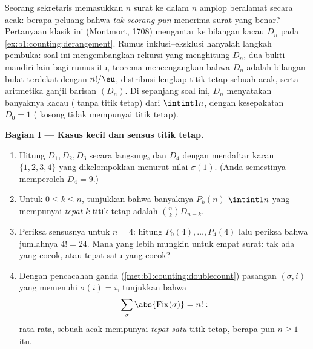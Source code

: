 \begin{problem}\label{pb:b1:counting:1}
Seorang sekretaris memasukkan $n$ surat ke dalam $n$ amplop beralamat secara acak:
berapa peluang bahwa \emph{tak seorang pun} menerima surat yang benar?
Pertanyaan klasik ini (Montmort, 1708) mengantar ke bilangan 
kacau $D_n$ pada \cref{ex:b1:counting:derangement}. Rumus
inklusi--eksklusi hanyalah langkah pembuka: soal ini
mengembangkan rekursi yang menghitung $D_n$, dua bukti mandiri lain
bagi rumus itu, teorema mencengangkan bahwa $D_n$ adalah
bilangan bulat terdekat dengan $n!/\eu$, distribusi lengkap titik tetap
sebuah  acak, serta aritmetika ganjil barisan
$(D_n)$.
Di sepanjang soal ini, $D_n$ menyatakan banyaknya  kacau (
tanpa titik tetap) dari $\intint1n$, dengan kesepakatan $D_0 = 1$
( kosong tidak mempunyai titik tetap).

\medskip
\noindent\textbf{Bagian I --- Kasus kecil dan sensus titik
tetap.}
\begin{enumerate}
  \item Hitung $D_1, D_2, D_3$ secara langsung, dan $D_4$ dengan mendaftar
         kacau $\{1, 2, 3, 4\}$ yang dikelompokkan menurut nilai
        $\sigma(1)$. (Anda semestinya memperoleh $D_4 = 9$.)
  \item Untuk $0 \leq k \leq n$, tunjukkan bahwa banyaknya $P_k(n)$
         $\intint1n$ yang mempunyai \emph{tepat} $k$ titik
        tetap adalah $\binom nk D_{n-k}$.
  \item Periksa sensusnya untuk $n = 4$: hitung $P_0(4), \dots,
        P_4(4)$ lalu periksa bahwa jumlahnya $4! = 24$. Mana yang lebih
        mungkin untuk empat surat: tak ada yang cocok, atau tepat satu yang cocok?
  \item Dengan pencacahan ganda (\cref{met:b1:counting:doublecount})
        pasangan $(\sigma, i)$ yang memenuhi $\sigma(i) = i$, tunjukkan bahwa
        \[
        \sum_{\sigma} \abs{\mathrm{Fix}(\sigma)} = n! :
        \]
        rata-rata, sebuah  acak mempunyai \emph{tepat satu}
        titik tetap, berapa pun $n \geq 1$ itu.
\end{enumerate}


\end{problem}
